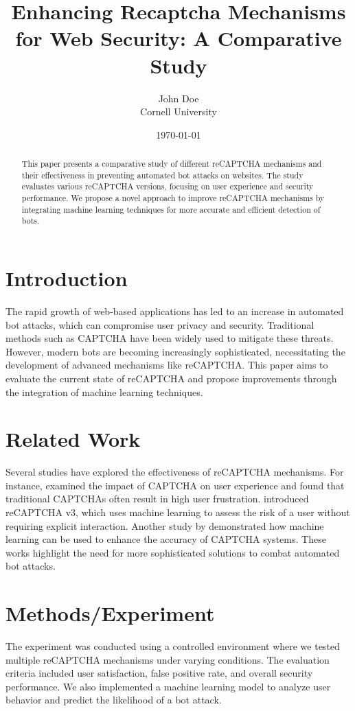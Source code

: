\documentclass{article}
\title{Enhancing Recaptcha Mechanisms for Web Security: A Comparative Study}
\author{John Doe\\ Cornell University}
\date{\today}
\begin{document}
\maketitle

\begin{abstract}
This paper presents a comparative study of different reCAPTCHA mechanisms and their effectiveness in preventing automated bot attacks on websites. The study evaluates various reCAPTCHA versions, focusing on user experience and security performance. We propose a novel approach to improve reCAPTCHA mechanisms by integrating machine learning techniques for more accurate and efficient detection of bots.
\end{abstract}

\section{Introduction}
The rapid growth of web-based applications has led to an increase in automated bot attacks, which can compromise user privacy and security. Traditional methods such as CAPTCHA have been widely used to mitigate these threats. However, modern bots are becoming increasingly sophisticated, necessitating the development of advanced mechanisms like reCAPTCHA. This paper aims to evaluate the current state of reCAPTCHA and propose improvements through the integration of machine learning techniques.

\section{Related Work}
Several studies have explored the effectiveness of reCAPTCHA mechanisms. For instance, \cite{capthaca_study} examined the impact of CAPTCHA on user experience and found that traditional CAPTCHAs often result in high user frustration. \cite{recaptcha_v3} introduced reCAPTCHA v3, which uses machine learning to assess the risk of a user without requiring explicit interaction. Another study by \cite{ml_captcha} demonstrated how machine learning can be used to enhance the accuracy of CAPTCHA systems. These works highlight the need for more sophisticated solutions to combat automated bot attacks.

\section{Methods/Experiment}
The experiment was conducted using a controlled environment where we tested multiple reCAPTCHA mechanisms under varying conditions. The evaluation criteria included user satisfaction, false positive rate, and overall security performance. We also implemented a machine learning model to analyze user behavior and predict the likelihood of a bot attack.
\end{document}
